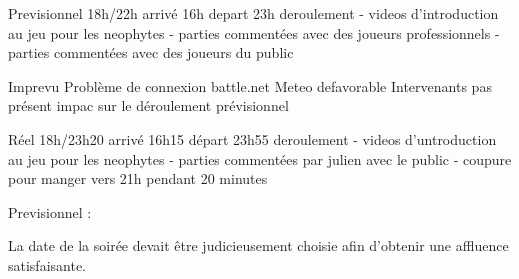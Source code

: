 Previsionnel
    18h/22h
    arrivé 16h
    depart 23h
    deroulement
        - videos d'introduction au jeu pour les neophytes
        - parties commentées avec des joueurs professionnels
        - parties commentées avec des joueurs du public

Imprevu
   Problème de connexion battle.net
   Meteo defavorable
   Intervenants pas présent
   impac sur le déroulement prévisionnel

Réel
    18h/23h20
    arrivé 16h15
    départ 23h55
    deroulement
        - videos d'untroduction au jeu pour les neophytes
        - parties commentées par julien avec le public
        - coupure pour manger vers 21h pendant 20 minutes

Previsionnel :

La date de la soirée devait être judicieusement choisie afin d'obtenir une affluence satisfaisante.


